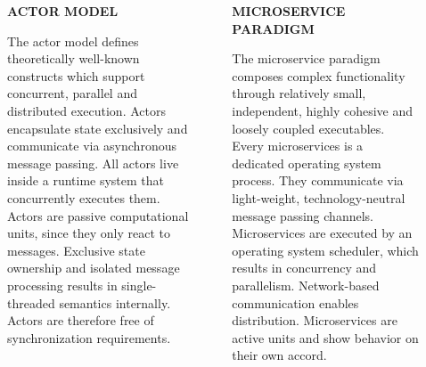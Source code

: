 \documentclass[final,hyperref={pdfpagelabels=true}]{beamer}
\begin{document}
\begin{frame}
  \begin{columns}[t]
    \begin{column}{.04\textwidth}
    \end{column}
    \begin{column}{.43\textwidth}
      \textsf{\textbf{ACTOR MODEL}} \\
      \vspace*{.5\baselineskip}
      {\lmodern
        \begin{justify}
        The actor model defines theoretically well-known constructs which support concurrent, parallel and distributed execution. Actors encapsulate state exclusively and communicate via asynchronous message passing. All actors live inside a runtime system that concurrently executes them. Actors are passive computational units, since they only react to messages. Exclusive state ownership and isolated message processing results in single-threaded semantics internally. Actors are therefore free of synchronization requirements.
        \end{justify}
      }
    \end{column}
    \begin{column}{.06\textwidth}
    \end{column}
    \begin{column}{.43\textwidth}
      \textsf{\textbf{MICROSERVICE PARADIGM}} \\
      \vspace*{.5\baselineskip}
      {\lmodern
        \begin{justify}
        The microservice paradigm composes complex functionality through relatively small, independent, highly cohesive and loosely coupled executables. Every microservices is a dedicated operating system process. They communicate via light-weight, technology-neutral message passing channels. Microservices are executed by an operating system scheduler, which results in concurrency and parallelism. Network-based communication enables distribution. Microservices are active units and show behavior on their own accord.
        \end{justify}
      }
    \end{column}
    \begin{column}{.04\textwidth}
    \end{column}
  \end{columns}

  \vspace*{4\baselineskip}


\end{frame}
\end{document}
